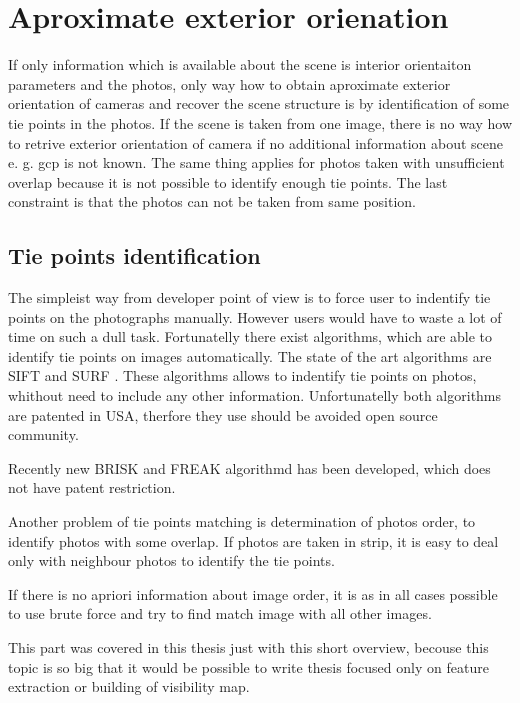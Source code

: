\documentclass[a4paper,12pt]{report}
\begin{document}
\section{Aproximate exterior orienation}

If only information which is available about the scene is interior orientaiton parameters and the photos, 
only way how to obtain aproximate exterior orientation of cameras and recover the scene structure is 
by identification of some tie points in the photos. If the scene is taken from one image, there is no way how
to retrive exterior orientation of camera if no additional information about scene e. g. gcp is not known. 
The same thing applies for photos taken with  unsufficient overlap because it is not possible to 
identify enough tie points. The last constraint is that the photos can not be taken from same position.

\subsection{Tie points identification}

The simpleist way from developer point of view is to force user to indentify tie points on 
the photographs manually. However users would have to waste a lot of time on such a 
dull task. Fortunatelly there  exist algorithms, which are able to identify tie points on images
automatically. The state of the art algorithms are SIFT \cite{wiki:SIFT} and SURF \cite{wiki:SURF}.
These algorithms allows to indentify tie points on photos, whithout need to include any other information.
Unfortunatelly both algorithms are patented in USA, therfore they use should be avoided open source community.

Recently new BRISK \cite{leutenegger2011brisk} and FREAK \cite{alahi2012freak} algorithmd 
has been developed, which does not have patent restriction. 

Another problem of tie points matching is determination of photos order, to identify photos with some overlap. 
If photos are taken in strip, it is easy to deal only with neighbour photos to identify the tie points.

If there is no apriori information about image order, it is as in all cases possible to use brute force and 
try to find match image with all other images.



This part was covered in this thesis just with this short overview, becouse this topic is so big 
that it would be possible to write thesis focused only on feature extraction or building of visibility map.
\end{document}

